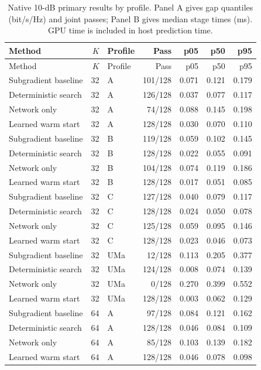 \documentclass[10pt,letterpaper]{article}
\begin{document}
\begingroup\small\setlength{\tabcolsep}{4pt}
\begin{longtable}{lrlrrrr}\caption{Native 10-dB primary results by profile. Panel A gives gap quantiles (bit/s/Hz) and joint passes; Panel B gives median stage times (ms). GPU time is included in host prediction time.}\label{supp:table3}\\
\toprule Method & $K$ & Profile & Pass & p05 & p50 & p95\\\midrule\endfirsthead\toprule Method & $K$ & Profile & Pass & p05 & p50 & p95\\\midrule\endhead\bottomrule\endfoot
Subgradient baseline & 32 & A & 101/128 & 0.071 & 0.121 & 0.179\\
Deterministic search & 32 & A & 126/128 & 0.037 & 0.077 & 0.117\\
Network only & 32 & A & 74/128 & 0.088 & 0.145 & 0.198\\
Learned warm start & 32 & A & 128/128 & 0.030 & 0.070 & 0.110\\
Subgradient baseline & 32 & B & 119/128 & 0.059 & 0.102 & 0.145\\
Deterministic search & 32 & B & 128/128 & 0.022 & 0.055 & 0.091\\
Network only & 32 & B & 104/128 & 0.074 & 0.119 & 0.186\\
Learned warm start & 32 & B & 128/128 & 0.017 & 0.051 & 0.085\\
Subgradient baseline & 32 & C & 127/128 & 0.040 & 0.079 & 0.117\\
Deterministic search & 32 & C & 128/128 & 0.024 & 0.050 & 0.078\\
Network only & 32 & C & 125/128 & 0.059 & 0.095 & 0.146\\
Learned warm start & 32 & C & 128/128 & 0.023 & 0.046 & 0.073\\
Subgradient baseline & 32 & UMa & 12/128 & 0.113 & 0.205 & 0.377\\
Deterministic search & 32 & UMa & 124/128 & 0.008 & 0.074 & 0.139\\
Network only & 32 & UMa & 0/128 & 0.270 & 0.399 & 0.552\\
Learned warm start & 32 & UMa & 128/128 & 0.003 & 0.062 & 0.129\\
Subgradient baseline & 64 & A & 97/128 & 0.084 & 0.121 & 0.162\\
Deterministic search & 64 & A & 128/128 & 0.046 & 0.084 & 0.109\\
Network only & 64 & A & 85/128 & 0.103 & 0.139 & 0.182\\
Learned warm start & 64 & A & 128/128 & 0.046 & 0.078 & 0.098\\

\end{longtable}
\end{document}

